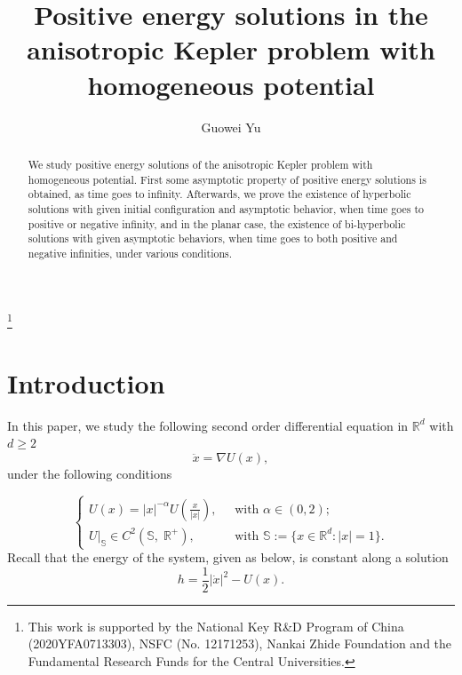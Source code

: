 \documentclass[11pt]{amsart}
\newcommand{\rr}{\mathbb R}
\newcommand{\bs}{\mathbb S}
\newcommand{\al}{\alpha}
\newcommand{\ey}{\frac{1}{2}}
\theoremstyle{plain}
\theoremstyle{definition}
\theoremstyle{remark}
\begin{document}
\title[positive energy solutions]{Positive energy solutions in the anisotropic Kepler problem with homogeneous potential}
 




\author{Guowei Yu}
\address{Chern Institute of Mathematics and LPMC, Nankai University, Tianjin, China}


\thanks{This work is supported by the National Key R\&D Program of China (2020YFA0713303), NSFC (No. 12171253), Nankai Zhide Foundation and the Fundamental Research Funds for the Central Universities.}


\begin{abstract}

We study positive energy solutions of the anisotropic Kepler problem with homogeneous potential. First some asymptotic property of positive energy solutions is obtained, as time goes to infinity. Afterwards, we prove the existence of hyperbolic solutions with given initial configuration and asymptotic behavior, when time goes to positive or negative infinity, and in the planar case, the existence of bi-hyperbolic solutions with given asymptotic behaviors, when time goes to both positive and negative infinities, under various conditions.  
\end{abstract} 


\maketitle

\section{Introduction }\label{sec:intro}
In this paper, we study the following second order differential equation in $\rr^d$ with $d \ge 2$  
\begin{equation}
\label{eq;aniso-kepler} \ddot{x} = \nabla U(x),  
\end{equation}
under the following conditions

\begin{equation}
\label{eq;U-homo}  \begin{cases}
U(x) = |x|^{-\al}U( \frac{x}{|x|}), \; & \text{ with } \al \in (0, 2); \\
U|_{\bs} \in C^2(\bs,\; \rr^+), \; & \text{ with } \bs := \{ x \in \rr^d: |x| =1\}. 
\end{cases} \tag{U0}
\end{equation}
Recall that the energy of the system, given as below, is constant along a solution  
\begin{equation}
\label{eq;energy} h = \ey |\dot{x}|^2 - U(x).
\end{equation}
\end{document}
